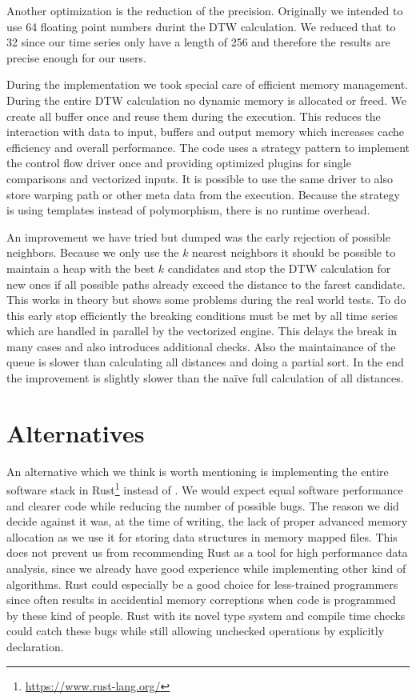 Another optimization is the reduction of the precision. Originally we intended to use \SI{64}{\bit} floating point numbers durint the DTW calculation. We reduced that to \SI{32}{\bit} since our time series only have a length of \num{256} and therefore the results are precise enough for our users.

During the implementation we took special care of efficient memory management. During the entire DTW calculation no dynamic memory is allocated or freed. We create all buffer once and reuse them during the execution. This reduces the interaction with data to input, buffers and output memory which increases cache efficiency and overall performance. The code uses a strategy pattern to implement the control flow driver once and providing optimized plugins for single comparisons and vectorized inputs. It is possible to use the same driver to also store warping path or other meta data from the execution. Because the strategy is using templates instead of polymorphism, there is no runtime overhead.

An improvement we have tried but dumped was the early rejection of possible neighbors. Because we only use the $k$ nearest neighbors it should be possible to maintain a heap with the best $k$ candidates and stop the DTW calculation for new ones if all possible paths already exceed the distance to the farest candidate. This works in theory but shows some problems during the real world tests. To do this early stop efficiently the breaking conditions must be met by all time series which are handled in parallel by the vectorized engine. This delays the break in many cases and also introduces additional checks. Also the maintainance of the queue is slower than calculating all distances and doing a partial sort. In the end the improvement is slightly slower than the na{\"i}ve full calculation of all distances.



\section{Alternatives}
\label{sec:implementation:alternatives}

An alternative which we think is worth mentioning is implementing the entire software stack in Rust\footnote{\url{https://www.rust-lang.org/}} instead of \Cpp{}. We would expect equal software performance and clearer code while reducing the number of possible bugs. The reason we did decide against it was, at the time of writing, the lack of proper advanced memory allocation as we use it for storing data structures in memory mapped files. This does not prevent us from recommending Rust as a tool for high performance data analysis, since we already have good experience while implementing other kind of algorithms. Rust could especially be a good choice for less-trained programmers since \Cpp{} often results in accidential memory correptions when code is programmed by these kind of people. Rust with its novel type system and compile time checks could catch these bugs while still allowing unchecked operations by explicitly declaration.
